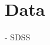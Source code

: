 \documentclass[modern]{aastex631}
\newcommand{\project}[1]{\textit{#1}}
\newcommand{\boss}{\project{BOSS}}
\newcommand{\todo}[1]{\textcolor{tab:red}{#1}}
\begin{document}




\section{Data}

- SDSS

\end{document}
